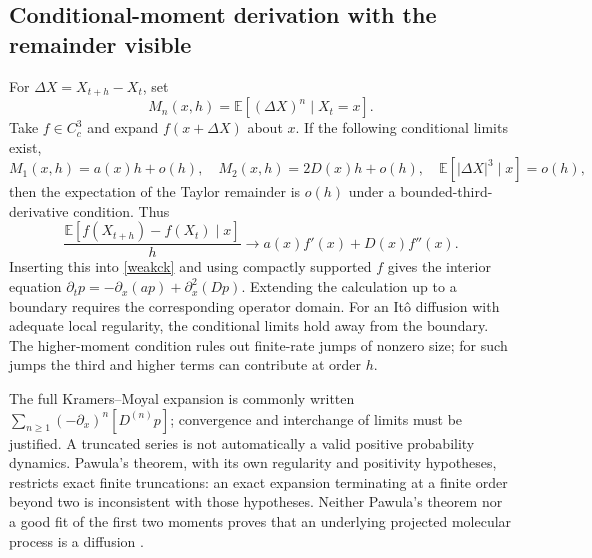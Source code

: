 \documentclass[11pt,a4paper]{article}
\newcommand{\E}{\mathbb E}
\theoremstyle{remark}\newtheorem*{remark}{Physical interpretation}
\begin{document}
\subsection{Conditional-moment derivation with the remainder visible}
For $\Delta X=X_{t+h}-X_t$, set
\begin{equation}
M_n(x,h)=\E[(\Delta X)^n\mid X_t=x].
\end{equation}
Take $f\in C_c^3$ and expand $f(x+\Delta X)$ about $x$. If the following conditional limits exist,
\begin{equation}
M_1(x,h)=a(x)h+o(h),\quad M_2(x,h)=2D(x)h+o(h),\quad \E[|\Delta X|^3\mid x]=o(h),
\end{equation}
then the expectation of the Taylor remainder is $o(h)$ under a bounded-third-derivative condition. Thus
\begin{equation}
\frac{\E[f(X_{t+h})-f(X_t)\mid x]}h
\longrightarrow a(x)f'(x)+D(x)f''(x).
\end{equation}
Inserting this into \eqref{weakck} and using compactly supported $f$ gives the interior equation $\partial_tp=-\partial_x(ap)+\partial_x^2(Dp)$. Extending the calculation up to a boundary requires the corresponding operator domain. For an It\^o diffusion with adequate local regularity, the conditional limits hold away from the boundary. The higher-moment condition rules out finite-rate jumps of nonzero size; for such jumps the third and higher terms can contribute at order $h$.

The full Kramers--Moyal expansion is commonly written $\sum_{n\ge1}(-\partial_x)^n[D^{(n)}p]$; convergence and interchange of limits must be justified. A truncated series is not automatically a valid positive probability dynamics. Pawula's theorem, with its own regularity and positivity hypotheses, restricts exact finite truncations: an exact expansion terminating at a finite order beyond two is inconsistent with those hypotheses. Neither Pawula's theorem nor a good fit of the first two moments proves that an underlying projected molecular process is a diffusion \cite{vankampen,risken}.
\end{document}
